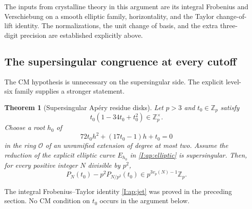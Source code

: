 \documentclass[11pt,letterpaper]{article}
\newtheorem{theorem}{Theorem}[section]
\theoremstyle{definition}
\theoremstyle{remark}
\begin{document}
The inputs from crystalline theory in this argument are its integral
Frobenius and Verschiebung on a smooth elliptic family, horizontality,
and the Taylor change-of-lift identity. The normalizations, the unit
change of basis, and the extra three-digit precision are established
explicitly above.

\subsection{The supersingular congruence at every cutoff}

The CM hypothesis is unnecessary on the supersingular side. The explicit
level-six family supplies a stronger statement.

\begin{theorem}[Supersingular Ap\'ery residue disks]\label{I:thm:aperydisks}
Let $p>3$ and $t_0\in\mathbb Z_p$ satisfy
\[
 t_0(1-34t_0+t_0^2)\in\mathbb Z_p^\times.
\]
Choose a root $h_0$ of
\[
 72t_0h^2+(17t_0-1)h+t_0=0
\]
in the ring $\mathcal O$ of an unramified extension of degree at most two.
Assume the reduction of the explicit elliptic curve $E_{h_0}$ in
\eqref{I:ap:elliptic} is supersingular. Then, for every positive integer
$N$ divisible by $p^2$,
\begin{equation}\label{I:ap:ssdisks}
 P_N(t_0)-p^2P_{N/p^2}(t_0)
       \in p^{3v_p(N)-1}\mathbb Z_p.
\end{equation}
\end{theorem}
The integral Frobenius--Taylor identity \eqref{I:ap:jet} was proved in the
preceding section. No CM condition on
$t_0$ occurs in the argument below.
\end{document}
